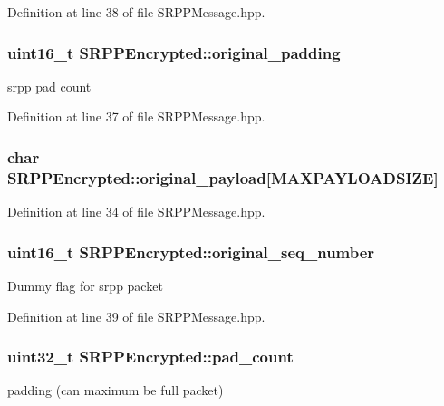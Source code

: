 Definition at line 38 of file SRPPMessage.hpp.

\hypertarget{struct_s_r_p_p_encrypted_abed0d941f10c16d5ad1d6e78db68ccbc}{
\subsubsection[{original\_\-padding}]{\setlength{\rightskip}{0pt plus 5cm}uint16\_\-t {\bf SRPPEncrypted::original\_\-padding}}}
\label{struct_s_r_p_p_encrypted_abed0d941f10c16d5ad1d6e78db68ccbc}
srpp pad count 

Definition at line 37 of file SRPPMessage.hpp.

\hypertarget{struct_s_r_p_p_encrypted_a33ecea6c4097b5cfce9b5b9dea56d8c6}{
\subsubsection[{original\_\-payload}]{\setlength{\rightskip}{0pt plus 5cm}char {\bf SRPPEncrypted::original\_\-payload}\mbox{[}MAXPAYLOADSIZE\mbox{]}}}
\label{struct_s_r_p_p_encrypted_a33ecea6c4097b5cfce9b5b9dea56d8c6}


Definition at line 34 of file SRPPMessage.hpp.

\hypertarget{struct_s_r_p_p_encrypted_a9b74b2f6e42139739ab9248296702a14}{
\subsubsection[{original\_\-seq\_\-number}]{\setlength{\rightskip}{0pt plus 5cm}uint16\_\-t {\bf SRPPEncrypted::original\_\-seq\_\-number}}}
\label{struct_s_r_p_p_encrypted_a9b74b2f6e42139739ab9248296702a14}
Dummy flag for srpp packet 

Definition at line 39 of file SRPPMessage.hpp.

\hypertarget{struct_s_r_p_p_encrypted_acbe8fec63c0347dc4021e38a9e2dbcc5}{
\subsubsection[{pad\_\-count}]{\setlength{\rightskip}{0pt plus 5cm}uint32\_\-t {\bf SRPPEncrypted::pad\_\-count}}}
\label{struct_s_r_p_p_encrypted_acbe8fec63c0347dc4021e38a9e2dbcc5}
padding (can maximum be full packet) 

